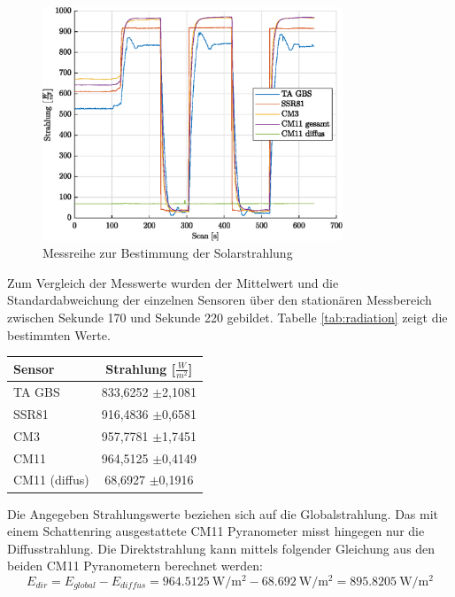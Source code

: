 \begin{figure}[H]
	\centering
	\includegraphics[width=0.8\textwidth]{../DATA/Messreihe_Strahlung.eps}
	\caption[Messreihe zur Bestimmung der Solarstrahlung]{Messreihe zur Bestimmung der Solarstrahlung}
	\label{fig:radiation}
\end{figure}
Zum Vergleich der Messwerte wurden der Mittelwert und die Standardabweichung der einzelnen Sensoren über den stationären Messbereich zwischen Sekunde 170 und Sekunde 220 gebildet. Tabelle \ref{tab:radiation} zeigt die bestimmten Werte.
\begin{center}
\begin{tabular}{l|c}
	\label{tab:radiation}
	
	\textbf{Sensor} & \textbf{Strahlung [$\frac{W}{m^2}$]}\\
	\hline
	TA GBS & 833,6252 $\pm$2,1081\\
	SSR81 & 916,4836 $\pm$0,6581\\
	CM3 & 957,7781 $\pm$1,7451\\
	CM11 & 964,5125 $\pm$0,4149\\
	CM11 (diffus) & 68,6927 $\pm$0,1916
\end{tabular} 
\end{center}

Die Angegeben Strahlungswerte beziehen sich auf die Globalstrahlung. Das mit einem Schattenring ausgestattete CM11 Pyranometer misst hingegen nur die Diffusstrahlung. Die Direktstrahlung kann mittels folgender Gleichung aus den beiden CM11 Pyranometern berechnet werden:
\begin{equation}
	\label{eq:Edir}
	E_{dir}=E_{global}-E_{diffus}=\SI{964.5125}{\watt\per\square\meter}-\SI{68.692}{\watt\per\square\meter} = \SI{895.8205}{\watt\per\square\meter}
\end{equation}

